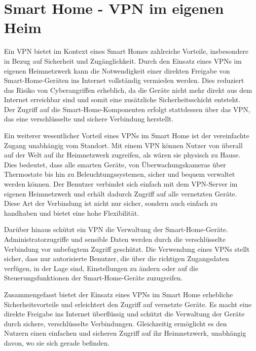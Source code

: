 \section{Smart Home - VPN im eigenen Heim} \label{vpn-home}
Ein \gls{VPN} bietet im Kontext eines Smart Homes zahlreiche Vorteile, insbesondere in Bezug auf Sicherheit und Zugänglichkeit. Durch den Einsatz eines \gls{VPN}s im eigenen Heimnetzwerk kann die Notwendigkeit einer direkten Freigabe von Smart-Home-Geräten ins Internet vollständig vermieden werden. Dies reduziert das Risiko von Cyberangriffen erheblich, da die Geräte nicht mehr direkt aus dem Internet erreichbar sind und somit eine zusätzliche Sicherheitsschicht entsteht.  Der Zugriff auf die Smart-Home-Komponenten erfolgt stattdessen über das \gls{VPN}, das eine verschlüsselte und sichere Verbindung herstellt.

Ein weiterer wesentlicher Vorteil eines \gls{VPN}s im Smart Home ist der vereinfachte Zugang unabhängig vom Standort. Mit einem \gls{VPN} können Nutzer von überall auf der Welt auf ihr Heimnetzwerk zugreifen, als wären sie physisch zu Hause. Dies bedeutet, dass alle smarten Geräte, von Überwachungskameras über Thermostate bis hin zu Beleuchtungssystemen, sicher und bequem verwaltet werden können. Der Benutzer verbindet sich einfach mit dem VPN-Server im eigenen Heimnetzwerk und erhält dadurch Zugriff auf alle vernetzten Geräte. Diese Art der Verbindung ist nicht nur sicher, sondern auch einfach zu handhaben und bietet eine hohe Flexibilität.

Darüber hinaus schützt ein \gls{VPN} die Verwaltung der Smart-Home-Geräte. Administratorzugriffe und sensible Daten werden durch die verschlüsselte Verbindung vor unbefugtem Zugriff geschützt. Die Verwendung eines \gls{VPN}s stellt sicher, dass nur autorisierte Benutzer, die über die richtigen Zugangsdaten verfügen, in der Lage sind, Einstellungen zu ändern oder auf die Steuerungsfunktionen der Smart-Home-Geräte zuzugreifen.

Zusammengefasst bietet der Einsatz eines \gls{VPN}s im Smart Home erhebliche Sicherheitsvorteile und erleichtert den Zugriff auf vernetzte Geräte. Es macht eine direkte Freigabe ins Internet überflüssig und schützt die Verwaltung der Geräte durch sichere, verschlüsselte Verbindungen. Gleichzeitig ermöglicht es den Nutzern einen einfachen und sicheren Zugriff auf ihr Heimnetzwerk, unabhängig davon, wo sie sich gerade befinden.